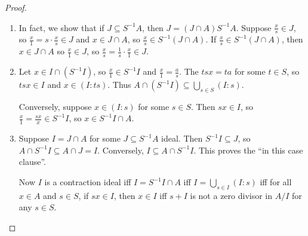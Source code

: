 \documentclass[11pt, a4paper]{memoir}
\theoremstyle{change}
\theoremstyle{plain}
\theoremstyle{nonumberplain}
\newtheorem{proof}{Proof}
\numberwithin{equation}{section}
\begin{document}
\begin{proof}
    \begin{enumerate}[r]
        \item In fact, we show that if $J\subseteq S^{-1}A$, then $J=(J\cap A)S^{-1}A$.
            Suppose $\frac{x}{s}\in J$, so $\frac{x}{1}=s\cdot\frac{x}{s}\in J$ and $x\in J\cap A$, so $\frac{x}{s}\in S^{-1}(J\cap A)$.
            If $\frac{x}{s}\in S^{-1}(J\cap A)$, then $x\in J\cap A$ so $\frac{x}{1}\in J$, so $\frac{x}{s}=\frac{1}{s}\cdot\frac{x}{1}\in J$.
        \item Let $x\in I\cap(S^{-1}I)$, so $\frac{x}{1}\in S^{-1}I$ and $\frac{x}{1}=\frac{a}{s}$.
            The $tsx=ta$ for some $t\in S$, so $tsx\in I$ and $x\in(I:ts)$.
            Thus $A\cap (S^{-1}I)\subseteq\bigcup_{s\in S}(I:s)$.

            Conversely, suppose $x\in(I:s)$ for some $s\in S$.
            Then $sx\in I$, so $\frac{x}{1}=\frac{sx}{x}\in S^{-1}I$, so $x\in S^{-1}I\cap A$.
        \item Suppose $I=J\cap A$ for some $J\subseteq S^{-1}A$ ideal.
            Then $S^{-1}I\subseteq J$, so $A\cap S^{-1}I\subseteq A\cap J=I$.
            Conversely, $I\subseteq A\cap S^{-1}I$.
            This proves the ``in this case clause''.

            Now $I$ is a contraction ideal iff $I=S^{-1}I\cap A$ iff $I=\bigcup_{s\in I}(I:s)$ iff for all $x\in A$ and $s\in S$, if $sx\in I$, then $x\in I$ iff $s+I$ is not a zero divisor in $A/I$ for any $s\in S$.
    \end{enumerate}
\end{proof}
\end{document}
